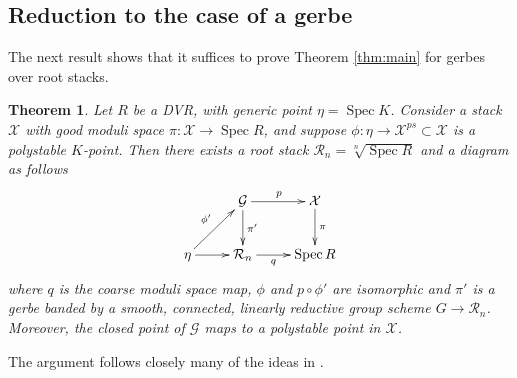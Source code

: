 \documentclass{amsart}
\newtheorem{theorem}{Theorem}[section]
\theoremstyle{definition}
\newcommand{\cG}{\mathcal{G}}
\newcommand{\cX}{\mathcal{X}}
\newcommand{\cR}{\mathcal{R}}
\newcommand{\spec}{\operatorname{Spec}}
\begin{document}
\subsection{Reduction to the case of a gerbe}

The next result shows that it suffices to prove Theorem \ref{thm:main} for gerbes over root stacks.

\begin{theorem}\label{theorem_reduction_to_gerbe}
    Let $R$ be a DVR, with generic point $\eta = \spec K$. Consider a stack $\cX$ with good moduli space $\pi:\cX \to \spec R$, and suppose $\phi:\eta \to \cX^{ps} \subset \cX$ is a polystable $K$-point. Then there exists a root stack $\cR_n = \sqrt[n]{\spec R}$ and a diagram as follows
    \[
    \xymatrix{&\cG\ar[r]^p \ar[d]^-{\pi'} & \cX\ar[d]^-\pi \\ \eta\ar[r]\ar[ru]^{\phi'} & \cR_n\ar[r]_-q & \spec R}
    \]
    where $q$ is the coarse moduli space map, $\phi$ and $p\circ \phi'$ are isomorphic and $\pi'$ is a gerbe banded by a smooth, connected, linearly reductive group scheme $G \to \cR_n$. Moreover, the closed point of $\cG$ maps to a polystable point in $\cX$.
\end{theorem}
The argument follows closely many of the ideas in \cite{bejleri2024proper}. 
\end{document}
